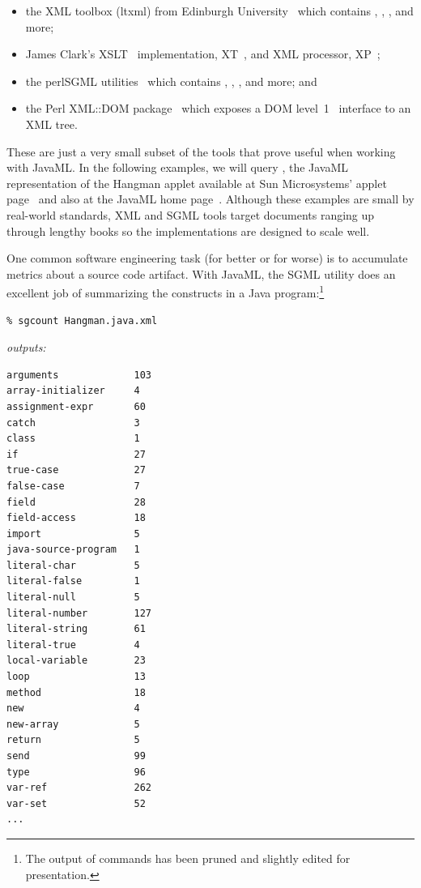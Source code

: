 \documentclass{article}
\begin{document}
\begin{multicols}{2}
\begin{itemize}
\item the XML toolbox (ltxml) from Edinburgh University~\cite{ltxml}
which contains ,
, , and more;

\item James Clark's XSLT~\cite{XSLT} implementation, XT~\cite{Clark-XT}, 
      and XML processor, XP~\cite{Clark-XP};

\item the perlSGML utilities~\cite{perlSGML} which
contains , ,
, and more; and

\item the Perl XML::DOM package~\cite{perlDOM} which exposes a
DOM level~1~\cite{DOM} interface to an XML tree.

\end{itemize}

These are just a very small subset of the tools that prove useful when
working with JavaML.  In the following examples, we will query
, the JavaML representation of the Hangman
applet available at Sun Microsystems' applet page~\cite{SunApplets} and
also at the JavaML home page~\cite{Badros-javaml}.  Although these examples
are small by real-world standards, XML and SGML tools target documents
ranging up through lengthy books so the implementations are designed to
scale well.

One common software engineering task (for better or for worse) is to
accumulate metrics about a source code artifact.  With JavaML, the SGML
utility  does an excellent job of summarizing the
constructs in a Java program:\footnote{The output of commands has been
  pruned and slightly edited for presentation.}


{\bfseries
\begin{verbatim}
% sgcount Hangman.java.xml
\end{verbatim}
}
\noindent\emph{outputs:}
{\small
\begin{verbatim}
arguments             103
array-initializer     4
assignment-expr       60
catch                 3
class                 1
if                    27
true-case             27
false-case            7
field                 28
field-access          18
import                5
java-source-program   1
literal-char          5
literal-false         1
literal-null          5
literal-number        127
literal-string        61
literal-true          4
local-variable        23
loop                  13
method                18
new                   4
new-array             5
return                5
send                  99
type                  96
var-ref               262
var-set               52
...
\end{verbatim}
}


\end{multicols}
\end{document}

